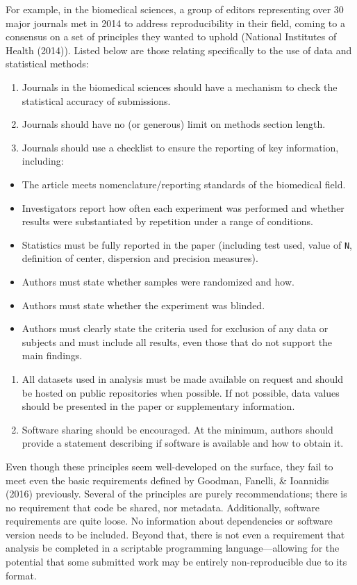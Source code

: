 \documentclass[12pt,twoside]{reedthesis}
\providecommand{\tightlist}{%
  \setlength{\itemsep}{0pt}\setlength{\parskip}{0pt}}
\begin{document}
For example, in the biomedical sciences, a group of editors representing over 30 major journals met in 2014 to address reproducibility in their field, coming to a consensus on a set of principles they wanted to uphold (National Institutes of Health (2014)). Listed below are those relating specifically to the use of data and statistical methods:
\begin{enumerate}
\def\labelenumi{\arabic{enumi})}
\item
  Journals in the biomedical sciences should have a mechanism to check the statistical accuracy of submissions.
\item
  Journals should have no (or generous) limit on methods section length.
\item
  Journals should use a checklist to ensure the reporting of key information, including:
\end{enumerate}
\begin{itemize}
\tightlist
\item
  The article meets nomenclature/reporting standards of the biomedical field.
\item
  Investigators report how often each experiment was performed and whether results were substantiated by repetition under a range of conditions.
\item
  Statistics must be fully reported in the paper (including test used, value of \texttt{N}, definition of center, dispersion and precision measures).
\item
  Authors must state whether samples were randomized and how.
\item
  Authors must state whether the experiment was blinded.
\item
  Authors must clearly state the criteria used for exclusion of any data or subjects and must include all results, even those that do not support the main findings.
\end{itemize}
\begin{enumerate}
\def\labelenumi{\arabic{enumi})}
\setcounter{enumi}{3}
\item
  All datasets used in analysis must be made available on request and should be hosted on public repositories when possible. If not possible, data values should be presented in the paper or supplementary information.
\item
  Software sharing should be encouraged. At the minimum, authors should provide a statement describing if software is available and how to obtain it.
\end{enumerate}
Even though these principles seem well-developed on the surface, they fail to meet even the basic requirements defined by Goodman, Fanelli, \& Ioannidis (2016) previously. Several of the principles are purely recommendations; there is no requirement that code be shared, nor metadata. Additionally, software requirements are quite loose. No information about dependencies or software version needs to be included. Beyond that, there is not even a requirement that analysis be completed in a scriptable programming language---allowing for the potential that some submitted work may be entirely non-reproducible due to its format.
\end{document}
